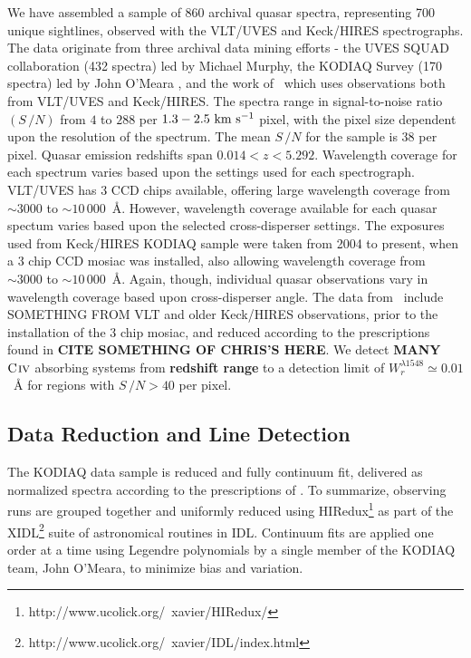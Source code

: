 \documentclass[linenumbers,twocolumn]{aastex61}
\begin{document}
We have assembled a sample of 860 archival quasar spectra, representing 700 unique sightlines, observed with the VLT/UVES and Keck/HIRES spectrographs. The data originate from three archival data mining efforts - the UVES SQUAD collaboration (432 spectra) led by Michael Murphy, the KODIAQ Survey (170 spectra) led by John O'Meara \citep{OMeara2015}, and the work of~\cite{EvansThesis} which uses observations both from VLT/UVES and Keck/HIRES. The spectra range in signal-to-noise ratio $(S\,/N)$ from $4$ to $288$ per $1.3 - 2.5~\mathrm{\hbox{km~s$^{-1}$}}$ pixel, with the pixel size dependent upon the resolution of the spectrum. The mean $S\,/N$ for the sample is $38$ per pixel. Quasar emission redshifts span $0.014 < z < 5.292$. Wavelength coverage for each spectrum varies based upon the settings used for each spectrograph. VLT/UVES has 3 CCD chips available, offering large wavelength coverage from $\sim 3000$ to $\sim10\,000$~{\AA}. However, wavelength coverage available for each quasar spectum varies based upon the selected cross-disperser settings. The exposures used from Keck/HIRES KODIAQ sample were taken from 2004 to present, when a 3 chip CCD mosiac was installed, also allowing wavelength coverage from  $\sim 3000$ to $\sim10\,000$~{\AA}. Again, though, individual quasar observations vary in wavelength coverage based upon cross-disperser angle. The data from~\cite{EvansThesis} include SOMETHING FROM VLT and older Keck/HIRES observations, prior to the installation of the 3 chip mosiac, and reduced according to the prescriptions found in {\bf CITE SOMETHING OF CHRIS'S HERE}. We detect {\bf MANY} ${\hbox{{\rm C}\kern 0.1em{\sc iv}}}$ absorbing systems from {\bf redshift range} to a detection limit of $W_r^{\lambda1548} \simeq 0.01$~{\AA} for regions with $S\,/N > 40$ per pixel.


\subsection{Data Reduction and Line Detection}
\label{sec:detection}

The KODIAQ data sample is reduced and fully continuum fit, delivered as normalized spectra according to the prescriptions of \cite{OMeara2015}. To summarize, observing runs are grouped together and uniformly reduced using HIRedux\footnote{http://www.ucolick.org/~xavier/HIRedux/} as part of the XIDL\footnote{http://www.ucolick.org/~xavier/IDL/index.html} suite of astronomical routines in IDL. Continuum fits are applied one order at a time using Legendre polynomials by a single member of the KODIAQ team, John O'Meara, to minimize bias and variation.
\end{document}
